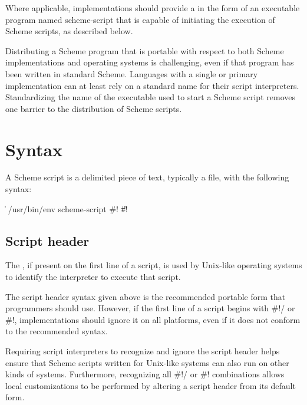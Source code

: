 \documentclass[twoside,twocolumn]{algol60}
\begin{document}
Where applicable, implementations should provide a  in 
the form of an executable program named {\cf scheme-script} that is 
capable of initiating the execution of Scheme scripts, as described 
below.

\begin{rationale}
Distributing a Scheme program that is portable with respect to both 
Scheme implementations and operating systems is challenging, even 
if that program has been written in standard Scheme.  Languages with 
a single or primary implementation can at least rely on a standard 
name for their script interpreters.  Standardizing the name of the 
executable used to start a Scheme script removes one barrier to the 
distribution of Scheme scripts.
\end{rationale}

\section{Syntax}
\label{scriptsyntaxsection}

A Scheme script is a delimited piece of text, typically a file, with 
the following syntax:

\begin{grammar}
 \:  
  \> \| 
 \:  /usr/bin/env  
  \> scheme-script 
 \: \#! \| \#! 
\end{grammar}

\subsection{Script header}

The , if present on the first line of a script,
is used by Unix-like operating systems to identify the interpreter to 
execute that script.

The script header syntax given above is the recommended portable 
form that programmers should use.  However, if the first line 
of a script begins with {\cf \#!/} or {\cf \#!}, 
implementations should ignore it on all platforms, even if it does not conform to 
the recommended syntax.  

\begin{rationale}
Requiring script interpreters to recognize and ignore the script 
header helps ensure that Scheme scripts written for Unix-like systems 
can also run on other kinds of systems. Furthermore, recognizing
all {\cf \#!/} or {\cf \#!} combinations 
allows local customizations to be 
performed by altering a script header from its default form.
\end{rationale}
\end{document}
